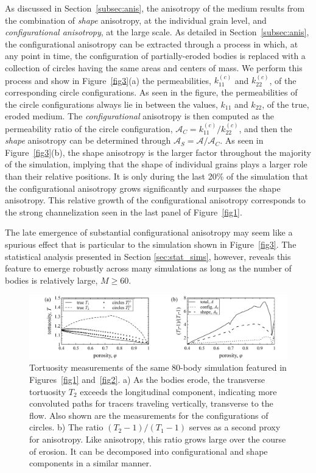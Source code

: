 \documentclass[3p]{elsarticle}
\newcommand{\edit}[1]{{\color{red} #1}}
\newcommand{\anis}{\mathcal{A}}
\begin{document}
As discussed in Section~\ref{subsec:anis}, the anisotropy of the medium results from the combination of {\em shape} anisotropy, at the individual grain level, and {\em configurational anisotropy}, at the large scale. As detailed in Section~\ref{subsec:anis}, the configurational anisotropy can be extracted through a process in which, at any point in time, the configuration of partially-eroded bodies is replaced with a collection of circles having the same areas and centers of mass. We perform this process and show in Figure~\ref{fig3}(a) the permeabilities, $k_{11}^{(c)}$ and $k_{22}^{(c)}$, of the corresponding circle configurations. As seen in the figure, the permeabilities of the circle configurations always lie in between the values, $k_{11}$ and $k_{22}$, of the true, eroded medium. The {\em configurational} anisotropy is then computed as the permeability ratio of the circle configuration, $\anis_C = k_{11}^{(c)} / k_{22}^{(c)}$, and then the {\em shape} anisotropy can be determined through $\anis_S = \anis/\anis_C$. As seen in Figure~\ref{fig3}(b), the shape anisotropy is the larger factor throughout the majority of the simulation, implying that the shape of individual grains plays a larger role than their relative positions. It is only during the last 20\% of the simulation that the configurational anisotropy grows significantly and surpasses the shape anisotropy. This relative growth of the configurational anisotropy corresponds to the strong channelization seen in the last panel of Figure~\ref{fig1}.

The late emergence of substantial configurational anisotropy may seem like a spurious effect that is particular to the simulation shown in Figure~\ref{fig3}. 
\edit{The statistical analysis presented in Section \ref{sec:stat_sims}, however, reveals this feature to emerge robustly across many simulations as long as the number of bodies is relatively large, $M \ge 60$.}

\begin{figure}%
\centering
\includegraphics[width = 0.99 \textwidth]{./figs/fig4.pdf}
\caption{
Tortuosity measurements of the same 80-body simulation featured in Figures~\ref{fig1} and~\ref{fig2}. a) As the bodies erode, the transverse tortuosity $T_2$ exceeds the longitudinal component, indicating more convoluted paths for tracers traveling vertically, transverse to the flow. Also shown are the measurements for the configurations of circles. b) The ratio $(T_2-1)/(T_1-1)$ serves as a second proxy for anisotropy. Like anisotropy, this ratio grows large over the course of erosion. It can be decomposed into configurational and shape components in a similar manner.
\label{fig4}
}
\end{figure}
\end{document}
